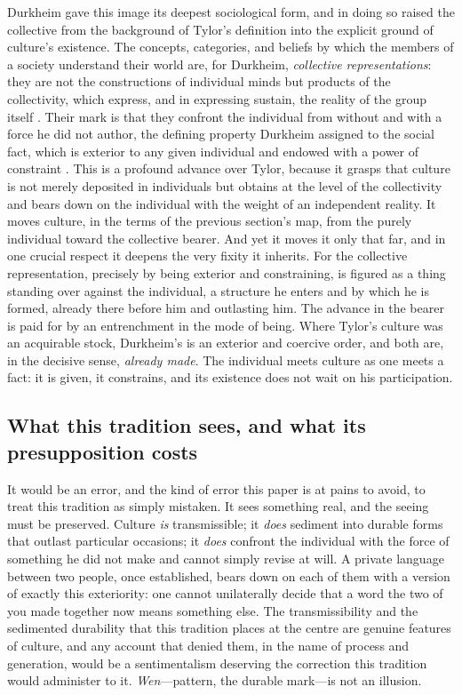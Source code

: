 Durkheim gave this image its deepest sociological form, and in doing so raised the collective from the background of Tylor's definition into the explicit ground of culture's existence. The concepts, categories, and beliefs by which the members of a society understand their world are, for Durkheim, \emph{collective representations}: they are not the constructions of individual minds but products of the collectivity, which express, and in expressing sustain, the reality of the group itself \parencite{durkheim1912}. Their mark is that they confront the individual from without and with a force he did not author, the defining property Durkheim assigned to the social fact, which is exterior to any given individual and endowed with a power of constraint \parencite{durkheim1982rules}. This is a profound advance over Tylor, because it grasps that culture is not merely deposited in individuals but obtains at the level of the collectivity and bears down on the individual with the weight of an independent reality. It moves culture, in the terms of the previous section's map, from the purely individual toward the collective bearer. And yet it moves it only that far, and in one crucial respect it deepens the very fixity it inherits. For the collective representation, precisely by being exterior and constraining, is figured as a thing standing over against the individual, a structure he enters and by which he is formed, already there before him and outlasting him. The advance in the bearer is paid for by an entrenchment in the mode of being. Where Tylor's culture was an acquirable stock, Durkheim's is an exterior and coercive order, and both are, in the decisive sense, \emph{already made}. The individual meets culture as one meets a fact: it is given, it constrains, and its existence does not wait on his participation.

\subsection*{What this tradition sees, and what its presupposition costs}

It would be an error, and the kind of error this paper is at pains to avoid, to treat this tradition as simply mistaken. It sees something real, and the seeing must be preserved. Culture \emph{is} transmissible; it \emph{does} sediment into durable forms that outlast particular occasions; it \emph{does} confront the individual with the force of something he did not make and cannot simply revise at will. A private language between two people, once established, bears down on each of them with a version of exactly this exteriority: one cannot unilaterally decide that a word the two of you made together now means something else. The transmissibility and the sedimented durability that this tradition places at the centre are genuine features of culture, and any account that denied them, in the name of process and generation, would be a sentimentalism deserving the correction this tradition would administer to it. \emph{Wen}---pattern, the durable mark---is not an illusion.

